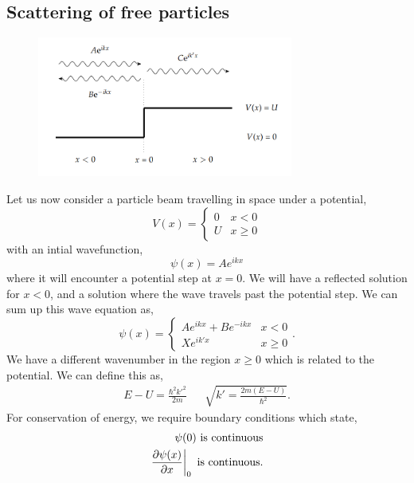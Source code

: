 \documentclass{book}
\begin{document}
\subsection{Scattering of free particles}
\begin{figure}
	\centering
	\includegraphics[width=0.75\textwidth]{potential.png}
	\caption{}
	\label{eq:potential barrier}
\end{figure}
Let us now consider a particle beam travelling in space under a potential,
\begin{equation}
	V(x) = \begin{cases}
		0 & x < 0 \\
		U & x \geq 0
	\end{cases}
\end{equation}
with an intial wavefunction,
\begin{equation}
	\psi(x) = Ae^{ikx}
\end{equation}
where it will encounter a potential step at $x = 0$. We will have a reflected solution for $x<0$, and a solution where the wave travels past the potential step. We can sum up this wave equation as,
\begin{equation}
	\psi(x) = \begin{cases}
		Ae^{ikx} + Be^{-ikx} & x<0 \\
		Xe^{ik'x} & x \geq 0
	\end{cases}.
\end{equation}
We have a different wavenumber in the region $x \geq 0$ which is related to the potential. We can define this as,
\begin{align}
	E - U = \frac{\hbar^2k'^2}{2m} && \sqrt{k' = \frac{2m(E-U)}{\hbar^2}}.
\end{align}
For conservation of energy, we require boundary conditions which state,
\begin{align}
	\psi(0) \text{ is continuous} \label{eq:conti1} \\
	\eval{\pdv{\psi(x)}{x}}_{0} \text{ is continuous} \label{eq:conti2}.
\end{align}
\end{document}

